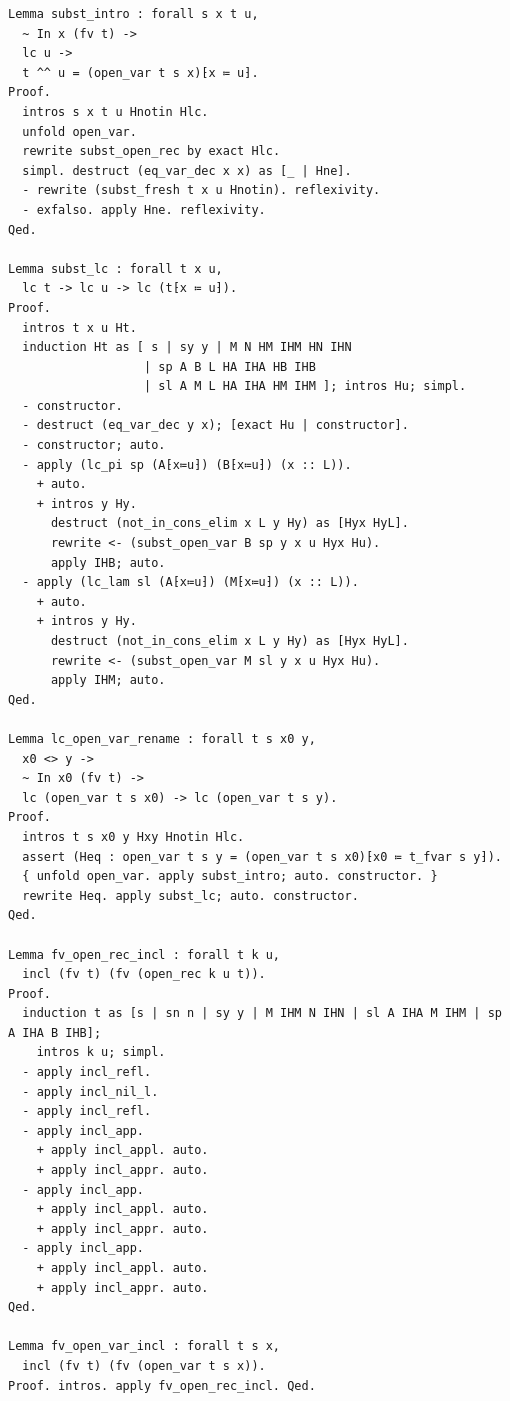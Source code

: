 \begin{latin}
\begin{verbatim}
Lemma subst_intro : forall s x t u,
  ~ In x (fv t) ->
  lc u ->
  t ^^ u = (open_var t s x)⁅x ≔ u⁆.
Proof.
  intros s x t u Hnotin Hlc.
  unfold open_var.
  rewrite subst_open_rec by exact Hlc.
  simpl. destruct (eq_var_dec x x) as [_ | Hne].
  - rewrite (subst_fresh t x u Hnotin). reflexivity.
  - exfalso. apply Hne. reflexivity.
Qed.

Lemma subst_lc : forall t x u,
  lc t -> lc u -> lc (t⁅x ≔ u⁆).
Proof.
  intros t x u Ht.
  induction Ht as [ s | sy y | M N HM IHM HN IHN
                   | sp A B L HA IHA HB IHB
                   | sl A M L HA IHA HM IHM ]; intros Hu; simpl.
  - constructor.
  - destruct (eq_var_dec y x); [exact Hu | constructor].
  - constructor; auto.
  - apply (lc_pi sp (A⁅x≔u⁆) (B⁅x≔u⁆) (x :: L)).
    + auto.
    + intros y Hy.
      destruct (not_in_cons_elim x L y Hy) as [Hyx HyL].
      rewrite <- (subst_open_var B sp y x u Hyx Hu).
      apply IHB; auto.
  - apply (lc_lam sl (A⁅x≔u⁆) (M⁅x≔u⁆) (x :: L)).
    + auto.
    + intros y Hy.
      destruct (not_in_cons_elim x L y Hy) as [Hyx HyL].
      rewrite <- (subst_open_var M sl y x u Hyx Hu).
      apply IHM; auto.
Qed.

Lemma lc_open_var_rename : forall t s x0 y,
  x0 <> y ->
  ~ In x0 (fv t) ->
  lc (open_var t s x0) -> lc (open_var t s y).
Proof.
  intros t s x0 y Hxy Hnotin Hlc.
  assert (Heq : open_var t s y = (open_var t s x0)⁅x0 ≔ t_fvar s y⁆).
  { unfold open_var. apply subst_intro; auto. constructor. }
  rewrite Heq. apply subst_lc; auto. constructor.
Qed.

Lemma fv_open_rec_incl : forall t k u,
  incl (fv t) (fv (open_rec k u t)).
Proof.
  induction t as [s | sn n | sy y | M IHM N IHN | sl A IHA M IHM | sp A IHA B IHB];
    intros k u; simpl.
  - apply incl_refl.
  - apply incl_nil_l.
  - apply incl_refl.
  - apply incl_app.
    + apply incl_appl. auto.
    + apply incl_appr. auto.
  - apply incl_app.
    + apply incl_appl. auto.
    + apply incl_appr. auto.
  - apply incl_app.
    + apply incl_appl. auto.
    + apply incl_appr. auto.
Qed.

Lemma fv_open_var_incl : forall t s x,
  incl (fv t) (fv (open_var t s x)).
Proof. intros. apply fv_open_rec_incl. Qed.


\end{verbatim}
\end{latin}
